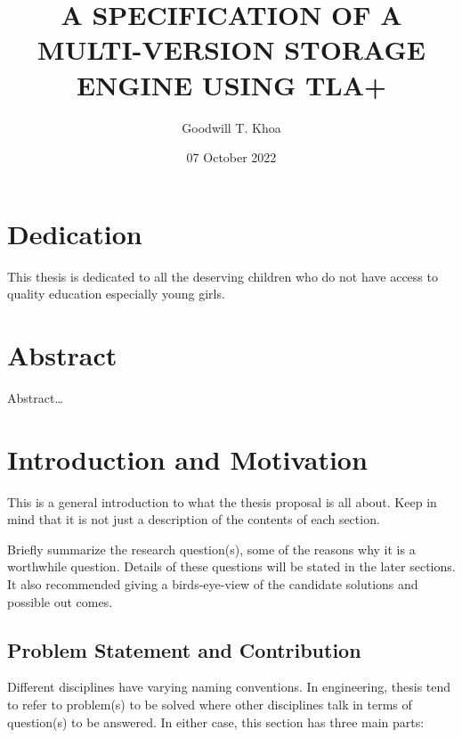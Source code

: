 \documentclass[11pt,a4paper,oneside]{book} %
\title{A SPECIFICATION OF A MULTI-VERSION STORAGE ENGINE USING TLA+}
\author{Goodwill T. Khoa}
\date{ 07 October 2022}
\numberwithin{equation}{section}
\begin{document}
\maketitle

\thesisAcceptanceCertificate
\evaluationcommitteeapproval{ }{ }{ }

\chapter*{Dedication}
This thesis is dedicated to all the deserving children who do not have access to quality education especially young girls.

\certificateoforiginality


\tableofcontents
\listoffigures
\listoftables

\chapter*{Abstract}
Abstract\ldots

\resetpagenumbering

\chapter{Introduction and Motivation}\label{c-intro}

This is a general introduction to what the thesis proposal is all about. Keep in mind that it is not just a description of the contents of each section. 

Briefly summarize the research question(s), some of the reasons why it is a worthwhile question. Details of these questions will be stated in the later sections. It also recommended giving a birds-eye-view of the candidate solutions and possible out comes.

\section{Problem Statement and Contribution}
Different disciplines have varying naming conventions. In engineering, thesis tend to refer to problem(s) to be solved where other disciplines talk in terms of question(s) to be answered. In either case, this section has three main parts:
\end{document}
